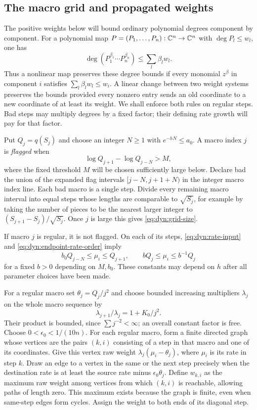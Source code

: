 \subsection{The macro grid and propagated weights}

The positive weights below will bound ordinary polynomial degrees
component by component.  For a polynomial map
$P=(P_1,\ldots,P_n):\mathbb C^n\to\mathbb C^n$ with $\deg P_l\le w_l$, one has
\[
 \deg(P_1^{\beta_1}\cdots P_n^{\beta_n})
 \le\sum_l\beta_lw_l.
\]
Thus a nonlinear map preserves these degree bounds if every monomial
$z^\beta$ in component $i$ satisfies
$\sum_l\beta_lw_l\le w_i$.  A linear change between two weight systems
preserves the bounds provided every nonzero entry sends an old
coordinate to a new coordinate of at least its weight.  We shall
enforce both rules on regular steps.  Bad steps may multiply degrees
by a fixed factor; their defining rate growth will pay for that factor.

Put $Q_j=q(S_j)$ and choose an integer $N\ge1$ with
$e^{-hN}\le a_0$.  A macro index $j$ is \emph{flagged} when
\begin{equation}
 \log Q_{j+1}-\log Q_{j-N}>M,
 \label{eq:dyn:flag}
\end{equation}
where the fixed threshold $M$ will be chosen sufficiently large below.
Declare bad the union of the expanded flag intervals
$[j-N,j+1+N)$ in the integer macro index line.  Each bad macro is a
single step.  Divide every remaining macro interval into equal steps
whose lengths are comparable to $\sqrt{S_j}$, for example by taking
the number of pieces to be the nearest larger integer to
$(S_{j+1}-S_j)/\sqrt{S_j}$.  Once $j$ is large this gives
\eqref{eq:dyn:grid-size}.

If macro $j$ is regular, it is not flagged.  On each of its steps,
\eqref{eq:dyn:rate-input} and \eqref{eq:dyn:endpoint-rate-order} imply
\begin{equation}
 b_0Q_{j-N}\le\mu_i\le Q_{j+1},\qquad
 bQ_j\le\mu_i\le b^{-1}Q_j
 \label{eq:dyn:regular-rates}
\end{equation}
for a fixed $b>0$ depending on $M,b_0$.  These constants may depend on
$h$ after all parameter choices have been made.

For a regular macro set $\theta_j=Q_j/j^2$ and choose bounded increasing
multipliers $\lambda_j$ on the whole macro sequence by
\[
 \lambda_{j+1}/\lambda_j=1+K_0/j^2.
\]
Their product is bounded, since $\sum j^{-2}<\infty$; an overall
constant factor is free.  Choose $0<\epsilon_0<1/(10n)$.
For each regular macro, form a finite directed graph whose vertices
are the pairs $(k,i)$ consisting of a step in that macro and one of
its coordinates.  Give this vertex raw weight
$\lambda_j(\mu_i-\theta_j)$, where $\mu_i$ is its rate in step $k$.
Draw an edge to a vertex in the same or the next step precisely when
the destination rate is at least the source rate minus
$\epsilon_0\theta_j$.  Define $w_{k,i}$ as the maximum raw weight
among vertices from which $(k,i)$ is reachable, allowing paths of
length zero.  This maximum exists because the graph is finite, even
when same-step edges form cycles.  Assign the weight to both ends of
its diagonal step.

